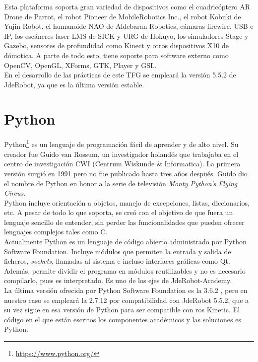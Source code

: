 Esta plataforma soporta gran variedad de dispositivos como el cuadricóptero AR Drone de Parrot, el robot Pioneer de MobileRobotics Inc., el robot Kobuki de Yujin Robot, el humanoide NAO de Aldebaran Robotics, cámaras firewire, USB e IP, los escáneres laser LMS de SICK y URG de Hokuyo, los simuladores Stage y Gazebo, sensores de profundidad como Kinect y otros dispositivos X10 de dómotica. A parte de todo esto, tiene soporte para software externo como OpenCV, OpenGL, XForms, GTK, Player y GSL.   \\

En el desarrollo de las prácticas de este TFG se empleará la versión 5.5.2 de JdeRobot, ya que es la última versión estable.


\section{Python}
Python\footnote{\url{https://www.python.org/}} es un lenguaje de programación fácil de aprender y de alto nivel. Su creador fue Guido van Rossum, un investigador holandés que trabajaba en el centro de investigación CWI (Centrum Wiskunde \& Informatica). La primera versión surgió en 1991 pero no fue publicado hasta tres años después. Guido dio el nombre de Python en honor a la serie de televisión  \textit{Monty Python’s Flying Circus}.\\


Python incluye orientación a objetos, manejo de excepciones, listas, diccionarios, etc. A pesar de todo lo que soporta, se creó con el objetivo de que fuera un lenguaje sencillo de entender, sin perder las funcionalidades que pueden ofrecer lenguajes complejos tales como C.\\

Actualmente Python es un lenguaje de código abierto administrado por Python Software Foundation. Incluye módulos que permiten la entrada y salida de ficheros, \textit{sockets}, llamadas al sistema e incluso interfaces gráficas como Qt. Además, permite dividir el programa en módulos reutilizables y no es necesario compilarlo, pues es interpretado. Es uno de los ejes de JdeRobot-Academy.\\

La última versión ofrecida por Python Software Foundation es la 3.6.2 , pero en nuestro caso se empleará la 2.7.12 por compatibilidad con JdeRobot 5.5.2, que a su vez sigue en esa versión de Python para ser compatible con \acrshort{ros} Kinetic. El código en el que están escritos los componentes académicos y las soluciones es Python.

